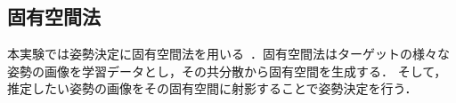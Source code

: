\documentclass{article}
\begin{document}

\subsection{固有空間法}
本実験では姿勢決定に固有空間法を用いる~\cite{10.1299/jsmermd.2013._2p1-m08_1,10.2322/jjsass.64.253}．固有空間法はターゲットの様々な姿勢の画像を学習データとし，その共分散から固有空間を生成する．
そして，推定したい姿勢の画像をその固有空間に射影することで姿勢決定を行う．
\end{document}
